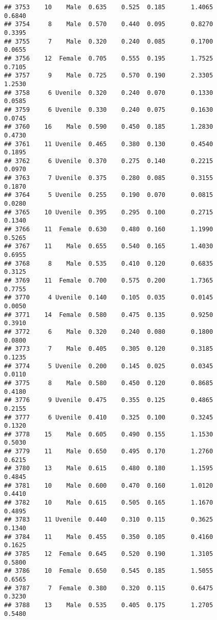 \documentclass[
]{article}
\begin{document}
\begin{verbatim}
## 3753    10    Male  0.635    0.525  0.185       1.4065         0.6840
## 3754     8    Male  0.570    0.440  0.095       0.8270         0.3395
## 3755     7    Male  0.320    0.240  0.085       0.1700         0.0655
## 3756    12  Female  0.705    0.555  0.195       1.7525         0.7105
## 3757     9    Male  0.725    0.570  0.190       2.3305         1.2530
## 3758     6 Uvenile  0.320    0.240  0.070       0.1330         0.0585
## 3759     6 Uvenile  0.330    0.240  0.075       0.1630         0.0745
## 3760    16    Male  0.590    0.450  0.185       1.2830         0.4730
## 3761    11 Uvenile  0.465    0.380  0.130       0.4540         0.1895
## 3762     6 Uvenile  0.370    0.275  0.140       0.2215         0.0970
## 3763     7 Uvenile  0.375    0.280  0.085       0.3155         0.1870
## 3764     5 Uvenile  0.255    0.190  0.070       0.0815         0.0280
## 3765    10 Uvenile  0.395    0.295  0.100       0.2715         0.1340
## 3766    11  Female  0.630    0.480  0.160       1.1990         0.5265
## 3767    11    Male  0.655    0.540  0.165       1.4030         0.6955
## 3768     8    Male  0.535    0.410  0.120       0.6835         0.3125
## 3769    11  Female  0.700    0.575  0.200       1.7365         0.7755
## 3770     4 Uvenile  0.140    0.105  0.035       0.0145         0.0050
## 3771    14  Female  0.580    0.475  0.135       0.9250         0.3910
## 3772     6    Male  0.320    0.240  0.080       0.1800         0.0800
## 3773     7    Male  0.405    0.305  0.120       0.3185         0.1235
## 3774     5 Uvenile  0.200    0.145  0.025       0.0345         0.0110
## 3775     8    Male  0.580    0.450  0.120       0.8685         0.4180
## 3776     9 Uvenile  0.475    0.355  0.125       0.4865         0.2155
## 3777     6 Uvenile  0.410    0.325  0.100       0.3245         0.1320
## 3778    15    Male  0.605    0.490  0.155       1.1530         0.5030
## 3779    11    Male  0.650    0.495  0.170       1.2760         0.6215
## 3780    13    Male  0.615    0.480  0.180       1.1595         0.4845
## 3781    10    Male  0.600    0.470  0.160       1.0120         0.4410
## 3782    10    Male  0.615    0.505  0.165       1.1670         0.4895
## 3783    11 Uvenile  0.440    0.310  0.115       0.3625         0.1340
## 3784    11    Male  0.455    0.350  0.105       0.4160         0.1625
## 3785    12  Female  0.645    0.520  0.190       1.3105         0.5800
## 3786    10  Female  0.650    0.545  0.185       1.5055         0.6565
## 3787     7  Female  0.380    0.320  0.115       0.6475         0.3230
## 3788    13    Male  0.535    0.405  0.175       1.2705         0.5480

\end{verbatim}
\end{document}
